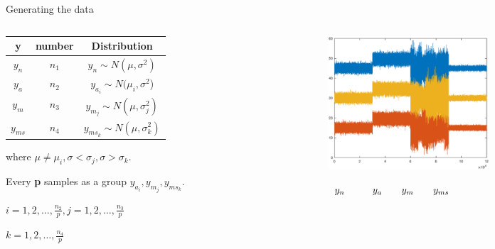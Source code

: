 \documentclass[10pt]{beamer}
\begin{document}
\begin{frame}{Generating the data}
 \begin{columns}
             \begin{column}{0.5\textwidth}
    \begin{center}
\begin{tabular}{ccc}
\hline
y& number& Distribution                                    \\
\hline
$y_n  $ &$n_1$& $y_n \sim N(\mu, \sigma^2)$                \\
$y_a  $ &$n_2$& $y_{a_i} \sim N(\mu_i,\sigma^2$)           \\
$y_m  $ &$n_3$& $y_{m_j} \sim N(\mu,\sigma_j^2)$           \\
$y_{ms}$ &$n_4$& $y_{ms_k} \sim N(\mu,\sigma_k^2)$  \\
\hline
\end{tabular}
\end{center}
where $\mu \neq \mu_i,\sigma < \sigma_j,\sigma > \sigma_k$. \par Every \textbf{p} samples as a group
$y_{a_i},y_{m_j},y_{ms_k}$. \par $i = 1,2,\dots,\frac{n_2}{p},j=1,2,\dots,\frac{n_3}{p}$ \par
$k = 1,2,\dots,\frac{n_4}{p}$
           \end{column}
        \begin{column}{0.5\textwidth}  %
   \begin{figure}
        \centering
        \includegraphics[width=6cm]{fig/four.eps} %
    \end{figure}
    $\hspace{1.2cm} y_n \hspace{1cm} y_a \hspace{0.7cm} y_m  \hspace{0.7cm} y_{ms}$
        \end{column}
    \end{columns}
\end{frame}
\end{document}
